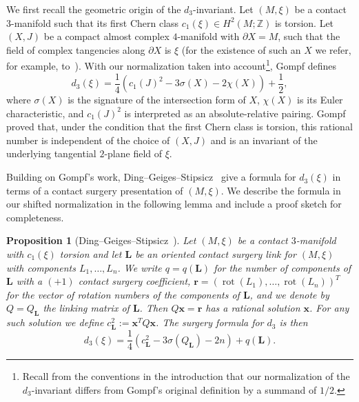 \documentclass{amsart}
\numberwithin{equation}{section}
\numberwithin{figure}{section}
\newtheorem{proposition}[theorem]{Proposition}
\theoremstyle{definition}
\theoremstyle{remark}
\DeclareMathOperator{\rot}{rot}
\let\olddxi\xi %
\renewcommand{\xi}{\olddxi}
\begin{document}
We first recall the geometric origin of the $d_3$-invariant. Let \((M,\xi)\) be a contact \(3\)-manifold such that its first Chern class \(c_1(\xi)\in H^2(M;\mathbb Z)\) is torsion. Let \((X,J)\) be a compact almost complex \(4\)-manifold with \(\partial X=M\), such that the field of complex tangencies along \(\partial X\) is \(\xi\) (for the existence of such an $X$ we refer, for example, to~\cite{Gompf}). With our normalization taken into account\footnote{Recall from the conventions in the introduction that our normalization of the $d_3$-invariant differs from Gompf's original definition by a summand of $1/2$.}, Gompf defines
\[
d_3(\xi)
=
\frac14\left(c_1(J)^2-3\sigma(X)-2\chi(X)\right)+\frac{1}{2},
\]
where \(\sigma(X)\) is the signature of the intersection form of \(X\), \(\chi(X)\) is its Euler characteristic, and \(c_1(J)^2\) is interpreted as an absolute-relative pairing. Gompf proved that, under the condition that the first Chern class is torsion, this rational number is independent of the choice of \((X,J)\) and is an invariant of the underlying tangential $2$-plane field of \(\xi\).

Building on Gompf's work, Ding--Geiges--Stipsicz~\cite{Ding_Geiges_Stipsicz} give a formula for \(d_3(\xi)\) in terms of a contact surgery presentation of \((M,\xi)\). We describe the formula in our shifted normalization in the following lemma and include a proof sketch for completeness.

\begin{proposition}[Ding--Geiges--Stipsicz~\cite{Ding_Geiges_Stipsicz}]\label{lem:d3_surgery_formula}
    Let \((M,\xi)\) be a contact \(3\)-manifold with \(c_1(\xi)\) torsion and let \(\boldsymbol L\) be an oriented contact surgery link for $(M,\xi)$ with components $L_1,\ldots,L_n$. We write \(q=q(\boldsymbol L)\) for the number of components of \(\boldsymbol L\) with a \((+1)\) contact surgery coefficient, $\boldsymbol r
=
(\rot(L_1),\ldots,\rot(L_n))^T$ 
for the vector of rotation numbers of the components of \(\boldsymbol L\), and we denote by \(Q=Q_{\boldsymbol L}\) the linking matrix of $\boldsymbol{L}$. 
Then $Q\boldsymbol x=\boldsymbol r$ has a rational solution $\boldsymbol{x}$. For any such solution we define $c_{\boldsymbol L}^2:=\boldsymbol x^TQ\boldsymbol x$. The surgery formula for \(d_3\) is then
\[
d_3(\xi)
=
\frac14\left(c_{\boldsymbol L}^2-3\sigma(Q_{\boldsymbol L})-2n\right)
+q(\boldsymbol L).
\]
\end{proposition}
\end{document}
